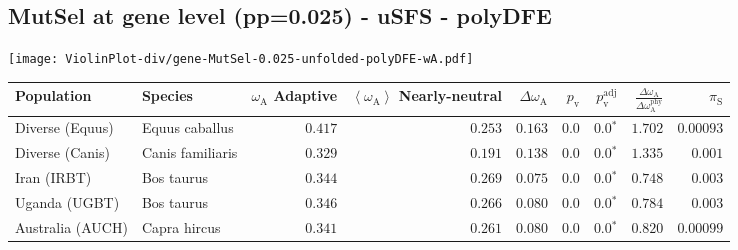 \subsection{MutSel at gene level (pp=0.025) - uSFS - polyDFE} 
\begin{center}
\texttt{[image: ViolinPlot-div/gene-MutSel-0.025-unfolded-polyDFE-wA.pdf]} 
\begin{adjustbox}{width = 1\textwidth}
\begin{tabular}{|l|l|r|r|r|r|r|r|r|}
\toprule
                     Population &              Species & \specialcell{$\omega_{\mathrm{A}}$ \\ Adaptive} & \specialcell{$\left< \omega_{\mathrm{A}} \right>$ \\ Nearly-neutral} & $\Delta \omega_{\mathrm{A}} $ & $p_{\mathrm{v}}$ & $p_{\mathrm{v}}^{\mathrm{adj}}$ & $\frac{\Delta\omega_{\mathrm{A}}}{\Delta\omega_{\mathrm{A}}^{\mathrm{phy}}}$ & $\pi_{\textrm{S}}$ \\
\midrule
                Diverse (Equus) &       Equus caballus &                                        $ 0.417$ &                                           $ 0.253$ &                      $ 0.163$ &            $0.0$ &                  $\bm{0.0{^*}}$ &                                           $ 1.702$ &          $0.00093$ \\
                Diverse (Canis) &     Canis familiaris &                                        $ 0.329$ &                                           $ 0.191$ &                      $ 0.138$ &            $0.0$ &                  $\bm{0.0{^*}}$ &                                           $ 1.335$ &           $ 0.001$ \\
                    Iran (IRBT) &           Bos taurus &                                        $ 0.344$ &                                           $ 0.269$ &                      $ 0.075$ &            $0.0$ &                  $\bm{0.0{^*}}$ &                                           $ 0.748$ &           $ 0.003$ \\
                  Uganda (UGBT) &           Bos taurus &                                        $ 0.346$ &                                           $ 0.266$ &                      $ 0.080$ &            $0.0$ &                  $\bm{0.0{^*}}$ &                                           $ 0.784$ &           $ 0.003$ \\
               Australia (AUCH) &         Capra hircus &                                        $ 0.341$ &                                           $ 0.261$ &                      $ 0.080$ &            $0.0$ &                  $\bm{0.0{^*}}$ &                                           $ 0.820$ &          $0.00099$ \\

\end{tabular}
\end{adjustbox}
\end{center}
